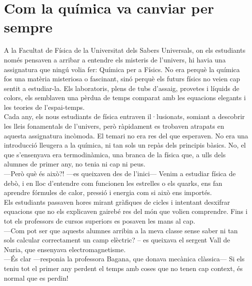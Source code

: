 \setlength{\parindent}{0pt}

\chapter{Com la química va canviar per sempre}


\lettrine[loversize=0.2, lines=2]{A}{ }la Facultat de Física de la Universitat dels Sabers Universals, on els estudiants només pensaven a arribar a entendre els misteris de l'univers, hi havia una assignatura que ningú volia fer: Química per a Físics. No era perquè la química fos una matèria misteriosa o fascinant, sinó perquè els futurs físics no veien cap sentit a estudiar-la. Els laboratoris, plens de tubs d'assaig, provetes i líquids de colors, els semblaven una pèrdua de temps comparat amb les equacions elegants i les teories de l'espai-temps.\\

Cada any, els nous estudiants de física entraven il·lusionats, somiant a descobrir les lleis fonamentals de l'univers, però ràpidament es trobaven atrapats en aquesta assignatura incòmoda. El temari no era res del que esperaven. No era una introducció lleugera a la química, ni tan sols un repàs dels principis bàsics. No, el que s'ensenyava era termodinàmica, una branca de la física que, a ulls dels alumnes de primer any, no tenia ni cap ni peus.\\

—Però què és això?! —es queixaven des de l'inici— Venim a estudiar física de debò, i en lloc d'entendre com funcionen les estrelles o els quarks, ens fan aprendre fórmules de calor, pressió i energia com si això ens importés.\\

Els estudiants passaven hores mirant gràfiques de cicles i intentant desxifrar equacions que no els explicaven gairebé res del món que volien comprendre. Fins i tot els professors de cursos superiors es posaven les mans al cap.\\

—Com pot ser que aquests alumnes arribin a la meva classe sense saber ni tan sols calcular correctament un camp elèctric? – es queixava el sergent Vall de Nuria, que ensenyava electromagnetisme.\\

—És clar —responia la professora Bagana, que donava mecànica clàssica— Si els teniu tot el primer any perdent el temps amb coses que no tenen cap context, és normal que es perdin!\\

